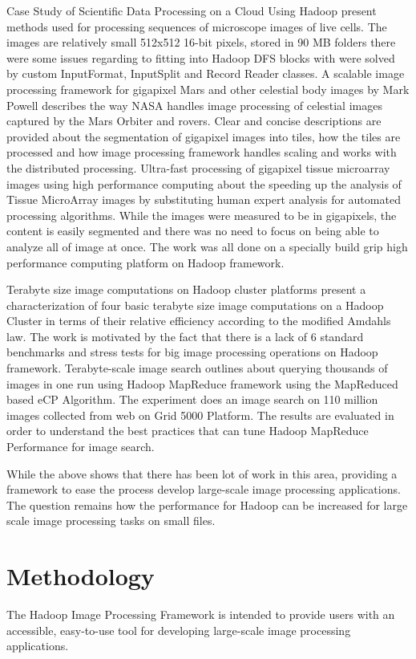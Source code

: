 \documentclass[conference]{IEEEtran}
\begin{document}
	Case Study of Scientific Data Processing on a Cloud Using Hadoop \cite{Zhang2010} present methods used for processing sequences of microscope images of live cells. The images are relatively small 512x512 16-bit pixels, stored in 90 MB folders there were some issues regarding to fitting into Hadoop DFS blocks with were solved by custom InputFormat, InputSplit and Record Reader classes. A scalable image processing framework for gigapixel Mars and other celestial body images by Mark Powell describes the way NASA handles image processing of celestial images captured by the Mars Orbiter and rovers. Clear and concise descriptions are provided about the segmentation of gigapixel images into tiles, how the tiles are processed and how image processing framework handles scaling and works with the distributed processing. Ultra-fast processing of gigapixel tissue microarray images using high performance computing \cite{Wang2011} about the speeding up the analysis of Tissue MicroArray images by substituting human expert analysis for automated processing algorithms. While the images were measured to be in gigapixels, the content is easily segmented and there was no need to focus on being able to analyze all of image at once. The work was all done on a specially build grip high performance	computing platform on Hadoop framework. 
	
	Terabyte size image computations on Hadoop cluster \cite{Bajcsy2013} platforms present a characterization of four basic terabyte size image computations on a Hadoop Cluster in terms of their relative efficiency according to the modified Amdahls law. The work is motivated by the fact that there is a lack of 6 standard benchmarks and stress tests for big image processing operations on Hadoop framework. Terabyte-scale image search\cite{Moise2013} outlines about querying thousands of images in one run using Hadoop MapReduce framework using the MapReduced based eCP Algorithm. The experiment does an image search on 110 million images collected from web on Grid 5000 Platform. The results are evaluated in order to understand the best practices that can tune Hadoop MapReduce Performance for image search.	
	
	While the above shows that there has been lot of work in this area, providing a framework to ease the process develop large-scale image processing applications. The question remains how the performance for Hadoop can be increased for large scale image processing tasks on small files.
	
\section{Methodology}
\label{methodology}
The Hadoop Image Processing Framework is intended to provide users
with an accessible, easy-to-use tool for developing large-scale image
processing applications.
\end{document}
